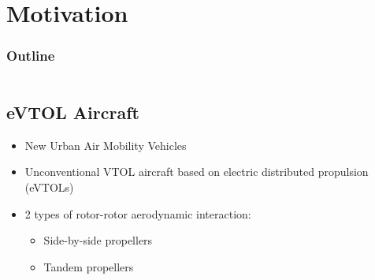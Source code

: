 \section{Motivation} 
  
\begin{frame}
    \frametitle{Outline}
    \begin{columns}[T]
        \begin{column}{.45\textwidth}
            \tableofcontents[sections=1-3,currentsection]
        \end{column}
        \begin{column}{.45\textwidth}
            \tableofcontents[sections=4-5,currentsection]
        \end{column}
    \end{columns}
\end{frame}

\subsection{eVTOL
Aircraft}
\begin{frame}{\subsecname}

\begin{itemize}
    \item New Urban Air Mobility Vehicles
    \item Unconventional VTOL aircraft based on electric distributed propulsion (eVTOLs)
    \item  2 types of rotor-rotor aerodynamic interaction:
    \begin{itemize}
        \item Side-by-side propellers
        \item Tandem propellers
    \end{itemize}
\end{itemize}
\begin{figure} [H]  
	\centering
  \quad
\end{figure}

\end{frame}







